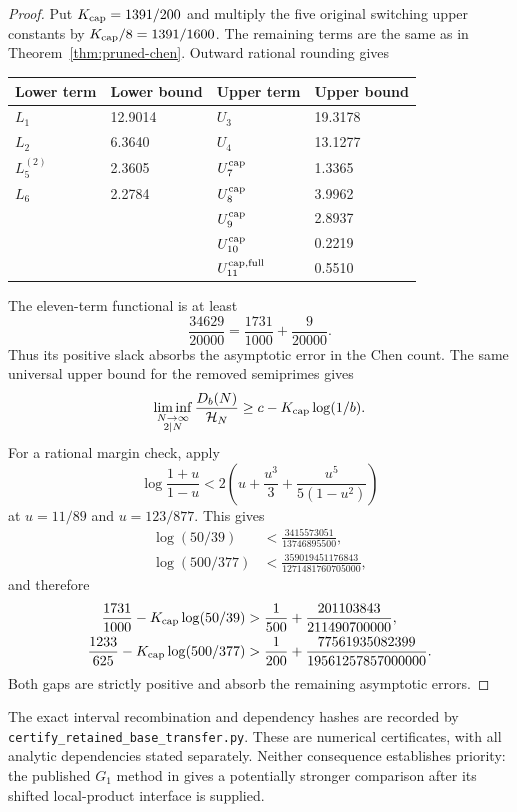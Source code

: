 \documentclass[11pt]{article}
\newcommand{\HN}{\mathcal H_N}
\begin{document}
\begin{proof}
Put $K_{\rm cap}=1391/200$ and multiply the five original switching
upper constants by $K_{\rm cap}/8=1391/1600$.
The remaining terms are the same as in
Theorem~\ref{thm:pruned-chen}. Outward rational rounding gives
\begin{center}
\begin{tabular}{ll@{\qquad}ll}
\toprule
Lower term&Lower bound&Upper term&Upper bound\\
\midrule
$L_1$&12.9014&$U_3$&19.3178\\
$L_2$&6.3640&$U_4$&13.1277\\
$L_5^{(2)}$&2.3605&$U_7^{\rm cap}$&1.3365\\
$L_6$&2.2784&$U_8^{\rm cap}$&3.9962\\
&&$U_9^{\rm cap}$&2.8937\\
&&$U_{10}^{\rm cap}$&0.2219\\
&&$U_{11}^{{\rm cap},{\rm full}}$&0.5510\\
\bottomrule
\end{tabular}
\end{center}
The eleven-term functional is at least
\[
 \frac{34629}{20000}
 =\frac{1731}{1000}+\frac9{20000}.
\]
Thus its positive slack absorbs the asymptotic error in the Chen count.
The same universal upper bound for the removed semiprimes gives
\[
 \liminf_{\substack{N\to\infty\\2\mid N}}
 \frac{D_b(N)}{\HN}\ge c-K_{\rm cap}\log(1/b).
\]
For a rational margin check, apply
\[
 \log\frac{1+u}{1-u}
 <2\left(u+\frac{u^3}{3}+\frac{u^5}{5(1-u^2)}\right)
\]
at $u=11/89$ and $u=123/877$. This gives
\begin{align*}
 \log(50/39)&<\frac{3415573051}{13746895500},\\
 \log(500/377)&<\frac{359019451176843}{1271481760705000},
\end{align*}
and therefore
\begin{align*}
 \frac{1731}{1000}-K_{\rm cap}\log(50/39)
 &>\frac1{500}+\frac{201103843}{211490700000},\\
 \frac{1233}{625}-K_{\rm cap}\log(500/377)
 &>\frac1{200}+\frac{77561935082399}{19561257857000000}.
\end{align*}
Both gaps are strictly positive and absorb the remaining asymptotic errors.
\end{proof}

The exact interval recombination and dependency hashes are recorded by
\texttt{certify\_retained\_base\_transfer.py}. These are numerical
certificates, with all analytic dependencies stated separately.
Neither consequence establishes priority: the published $G_1$ method
in \cite[(27)--(29)]{Li2026} gives a potentially stronger comparison
after its shifted local-product interface is supplied.
\end{document}
